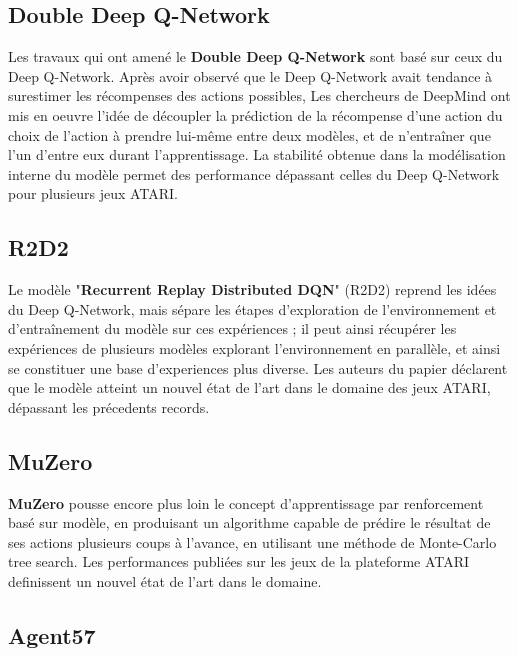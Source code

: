 \documentclass[a4paper,12pt]{article}
\begin{document}
\medskip
\subsection{Double Deep Q-Network}

Les travaux qui ont amené le \textbf{Double Deep Q-Network} \cite{double_ddqn} sont basé sur ceux du Deep Q-Network. Après avoir observé que le Deep Q-Network avait tendance à surestimer les récompenses des actions possibles, Les chercheurs de DeepMind ont mis en oeuvre l'idée de découpler la prédiction de la récompense d'une action du choix de l'action à prendre lui-même entre deux modèles, et de n'entraîner que l'un d'entre eux durant l'apprentissage. La stabilité obtenue dans la modélisation interne du modèle permet des performance dépassant celles du Deep Q-Network pour plusieurs jeux ATARI.\par

\medskip
\subsection{R2D2}

Le modèle "\textbf{Recurrent Replay Distributed DQN}" (R2D2) \cite{r2d2} reprend les idées du Deep Q-Network, mais sépare les étapes d'exploration de l'environnement et d'entraînement du modèle sur ces expériences ; il peut ainsi récupérer les expériences de plusieurs modèles explorant l'environnement en parallèle, et ainsi se constituer une base d'experiences plus diverse. Les auteurs du papier déclarent que le modèle atteint un nouvel état de l'art dans le domaine des jeux ATARI, dépassant les précedents records.\par

\medskip
\subsection{MuZero}

\textbf{MuZero} \cite{muzero} pousse encore plus loin le concept d'apprentissage par renforcement basé sur modèle, en produisant un algorithme capable de prédire le résultat de ses actions plusieurs coups à l'avance, en utilisant une méthode de Monte-Carlo tree search. Les performances publiées sur les jeux de la plateforme ATARI definissent un nouvel état de l'art dans le domaine.\par

\medskip
\subsection{Agent57}
\end{document}
